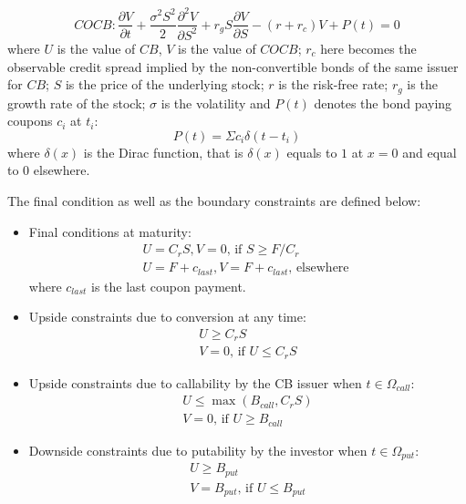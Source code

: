 \documentclass[12pt]{article}
\begin{document}
\begin{equation}
COCB: \frac{\partial{V}}{\partial{t}} + 
\frac{\sigma^2S^2}{2}\frac{\partial^2{V}}{\partial{S}^2} + r_gS\frac{\partial{V}}{\partial{S}} - (r+r_c)V + P(t) = 0 
\label{eq:COCB}
\end{equation}
where $U$ is the value of $CB$, $V$ is the value of $COCB$; $r_c$ here becomes the observable credit spread implied by the non-convertible bonds of the same issuer for $CB$; $S$ is the price of the underlying stock; $r$ is the risk-free rate; $r_g$ is the growth rate of the stock; $\sigma$ is the volatility and $P(t)$ denotes the bond paying coupons $c_i$ at $t_i$:
\begin{equation}
P(t) = \Sigma c_i\delta(t-t_i)
\label{eq:coupon}
\end{equation}
where $\delta(x)$ is the Dirac function, that is $\delta(x)$ equals to $1$ at $x = 0$ and equal to $0$ elsewhere.

The final condition as well as the boundary constraints are defined below:
\begin{itemize}
\item Final conditions at maturity:
\begin{eqnarray}
U = C_r S, V = 0\text{, if } S \ge F/C_r\\
U = F + c_{last}, V = F + c_{last}\text{, elsewhere }
\end{eqnarray}
where $c_{last}$ is the last coupon payment.

\item Upside constraints due to conversion at any time:
\begin{eqnarray}
U \ge C_r S\\
V = 0 \text{, if } U \le C_r S
\end{eqnarray}

\item Upside constraints due to callability by the CB issuer when $t\in \Omega_{call}$:
\begin{eqnarray}
U \le \max(B_{call}, C_rS)\\
V = 0 \text{, if } U \ge B_{call}
\end{eqnarray}

\item Downside constraints due to putability by the investor when $t \in \Omega_{put}$:
\begin{eqnarray}
U \ge B_{put} \\
V = B_{put} \text{, if } U \le B_{put}
\end{eqnarray}
 
\end{itemize}
\end{document}
